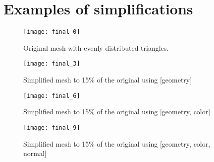 \chapter{Examples of simplifications}
\thispagestyle{empty}%

\begin{sidewaysfigure}[ht]
    \texttt{[image: final\_0]}
    \caption{Original mesh with evenly distributed triangles.}
    \label{fig:final_0}
\end{sidewaysfigure}

\newpage
\begin{sidewaysfigure}[ht]
    \texttt{[image: final\_3]}
    \caption{Simplified mesh to 15\% of the original using [geometry]}
    \label{fig:final_3}
\end{sidewaysfigure}

\newpage
\begin{sidewaysfigure}[ht]
    \texttt{[image: final\_6]}
    \caption{Simplified mesh to 15\% of the original using [geometry, color]}
    \label{fig:final_6}
\end{sidewaysfigure}

\newpage
\begin{sidewaysfigure}[ht]
    \texttt{[image: final\_9]}
    \caption{Simplified mesh to 15\% of the original using [geometry, color, normal]}
    \label{fig:final_9}
\end{sidewaysfigure}